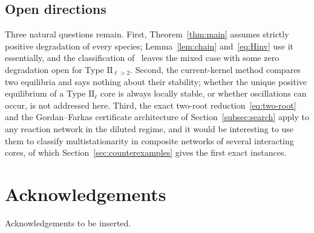 \documentclass[11pt,reqno]{amsart}
\theoremstyle{plain}
\theoremstyle{definition}
\theoremstyle{remark}
\numberwithin{equation}{section}
\begin{document}
\subsection{Open directions}
Three natural questions remain.  First, Theorem~\ref{thm:main} assumes strictly positive degradation of every species; Lemma~\ref{lem:chain} and~\eqref{eq:Hinv} use it essentially, and the classification of~\cite{NNU26} leaves the mixed case with some zero degradation open for Type $\mathrm{II}_{\ell>2}$.  Second, the current-kernel method compares two equilibria and says nothing about their stability; whether the unique positive equilibrium of a Type $\mathrm{II}_\ell$ core is always locally stable, or whether oscillations can occur, is not addressed here.  Third, the exact two-root reduction~\eqref{eq:two-root} and the Gordan--Farkas certificate architecture of Section~\ref{subsec:search} apply to any reaction network in the diluted regime, and it would be interesting to use them to classify multistationarity in composite networks of several interacting cores, of which Section~\ref{sec:counterexamples} gives the first exact instances.

\section*{Acknowledgements}
Acknowledgements to be inserted.
\end{document}
